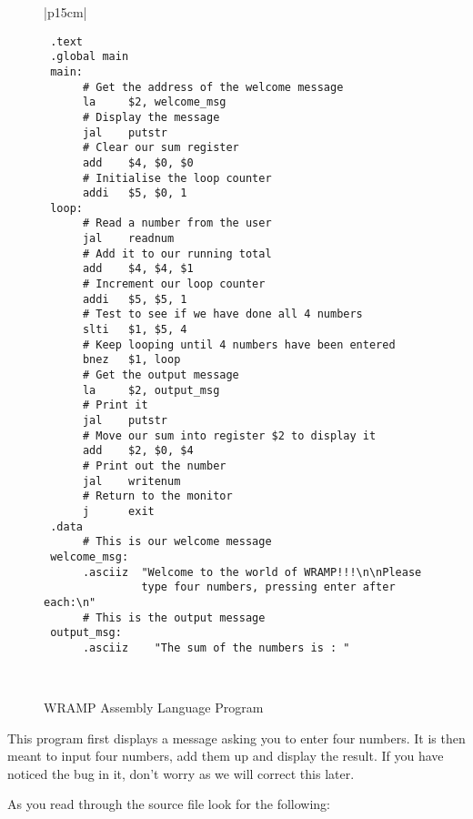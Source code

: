 %
%
\begin{figure}[btp]
\begin{center}
\begin{tabular}{|p{15cm}|}
\hline
\begin{verbatim}
 .text
 .global main
 main:
      # Get the address of the welcome message
      la     $2, welcome_msg
      # Display the message
      jal    putstr
      # Clear our sum register
      add    $4, $0, $0
      # Initialise the loop counter
      addi   $5, $0, 1
 loop:
      # Read a number from the user
      jal    readnum
      # Add it to our running total
      add    $4, $4, $1
      # Increment our loop counter
      addi   $5, $5, 1
      # Test to see if we have done all 4 numbers
      slti   $1, $5, 4
      # Keep looping until 4 numbers have been entered
      bnez   $1, loop
      # Get the output message
      la     $2, output_msg
      # Print it
      jal    putstr
      # Move our sum into register $2 to display it
      add    $2, $0, $4
      # Print out the number
      jal    writenum
      # Return to the monitor
      j      exit
 .data
      # This is our welcome message
 welcome_msg:
      .asciiz  "Welcome to the world of WRAMP!!!\n\nPlease
               type four numbers, pressing enter after each:\n"
      # This is the output message
 output_msg:
      .asciiz    "The sum of the numbers is : "
\end{verbatim}%

\\
\hline
\end{tabular}
\end{center}
\caption{WRAMP Assembly Language Program}
\label{simple_prog}
\end{figure}
%

This program first displays a message asking you to enter four numbers.  It
is then meant to input four numbers, add them up and display the result. 
If you have noticed the bug in it, don't worry as we will correct this later.

As you read through the source file look for the following:

